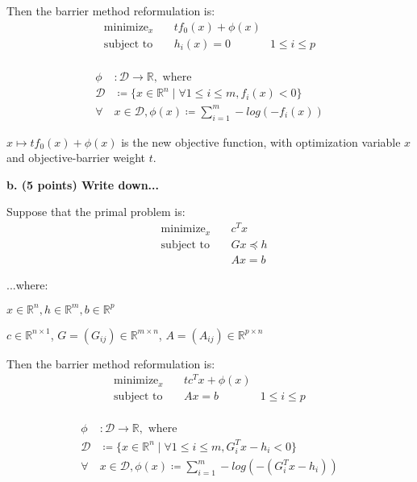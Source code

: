 \documentclass[a4paper,10pt]{article}
\theoremstyle{definition}
\begin{document}
Then the barrier method reformulation is: 
\[
\begin{aligned}
    \text{minimize}_{x} \quad & tf_0(x) + \phi(x)\\
    \text{subject to} \quad & h_i(x) = 0 \quad & 1 \leq i \leq p\\
\end{aligned}
\]

\[
\begin{aligned}
    \phi & : \mathcal{D} \rightarrow \mathbb{R}, \text{ where }\\
    \mathcal{D} & \coloneq \{x \in \mathbb{R} ^ n \mid \forall 1\leq i\leq m, f_i(x) < 0\}\\
    \forall & x \in \mathcal{D}, \phi(x) \coloneq \sum_{i=1}^{m} -log(-f_i(x))
\end{aligned}
\]

$x \mapsto tf_0(x) + \phi(x)$ is the new objective function,
with optimization variable $x$ and objective-barrier weight $t$.

\textbf{b. (5 points) Write down...}


Suppose that the primal problem is:
\[
\begin{aligned}
    & \text{minimize}_{x} \quad & c^Tx \\
    & \text{subject to} \quad & Gx \preceq h \\
    & \quad & Ax = b  
\end{aligned}
\]

...where:

$x \in \mathbb{R}^n, h \in \mathbb{R}^m, b \in \mathbb{R}^p$

$c \in \mathbb{R}^{n \times 1}$, $G = (G_{ij}) \in \mathbb{R}^{m \times n}$, $A = (A_{ij}) \in \mathbb{R}^{p \times n}$

Then the barrier method reformulation is: 
\[
\begin{aligned}
    \text{minimize}_{x} \quad & tc^Tx + \phi(x)\\
    \text{subject to} \quad & Ax = b \quad & 1 \leq i \leq p\\
\end{aligned}
\]

\[
\begin{aligned}
    \phi & : \mathcal{D} \rightarrow \mathbb{R}, \text{ where }\\
    \mathcal{D} & \coloneq \{x \in \mathbb{R} ^ n \mid \forall 1\leq i\leq m, G_i^Tx - h_i < 0\}\\
    \forall & x \in \mathcal{D}, \phi(x) \coloneq \sum_{i=1}^{m} -log(-(G_i^Tx - h_i))
\end{aligned}
\]
\end{document}
